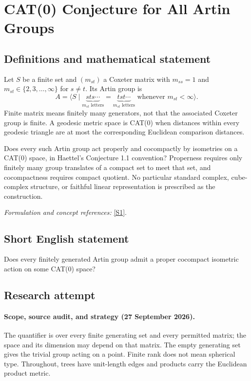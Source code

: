 \documentclass[11pt]{article}
\begin{document}
\section*{\texorpdfstring{CAT(0) Conjecture for All Artin Groups}{CAT(0) Conjecture for All Artin Groups}}\label{500}
\subsection{Definitions and mathematical statement}
Let $S$ be a finite set and $(m_{st})$ a Coxeter matrix with $m_{ss}=1$ and $m_{st}\in\{2,3,\ldots,\infty\}$ for $s\ne t$. Its Artin group is
\[
 A=\langle S\mid
 \underbrace{sts\cdots}_{m_{st}\text{ letters}}=
 \underbrace{tst\cdots}_{m_{st}\text{ letters}}
 \text{ whenever }m_{st}<\infty\rangle.
\]
Finite matrix means finitely many generators, not that the associated Coxeter group is finite. A geodesic metric space is CAT(0) when distances within every geodesic triangle are at most the corresponding Euclidean comparison distances.

Does every such Artin group act properly and cocompactly by isometries on a CAT(0) space, in Haettel's Conjecture 1.1 convention? Properness requires only finitely many group translates of a compact set to meet that set, and cocompactness requires compact quotient. No particular standard complex, cube-complex structure, or faithful linear representation is prescribed as the construction.
\par\smallskip\textit{Formulation and concept references:} \href{https://www.numdam.org/item/10.5802/aif.3524.pdf}{[S1]}.

\subsection{Short English statement}
Does every finitely generated Artin group admit a proper cocompact isometric action on some CAT(0) space?
\subsection{Research attempt}

\paragraph{Scope, source audit, and strategy (27 September 2026).}
The quantifier is over every finite generating set and every permitted matrix;
the space and its dimension may depend on that matrix. The empty generating
set gives the trivial group acting on a point. Finite rank does not mean
spherical type. Throughout, trees have unit-length edges and products carry
the Euclidean product metric.
\end{document}

